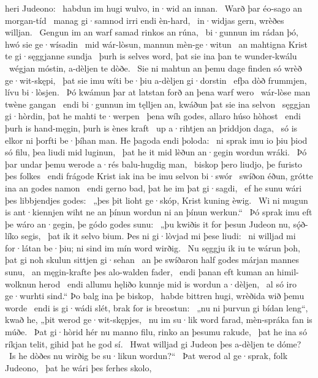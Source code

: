 heri Judeono: \hld\ habdun im hugi wulvo,
in·wid an innan. \hld\ Warð þar éo-sago
an morgan-tíd \hld\ manag gi·samnod
irri endi èn-hard, \hld\ in·widjas gern,
wrèðes willjan. \hld\ Gengun im an warf samad
rinkos an rúna, \hld\ bi·gunnun im rádan þó,
hwó sie ge·wísadin \hld\ mid wár-lòsun,
mannun mèn-ge·witun \hld\ an mahtigna Krist
te gi·sęggjanne sundja \hld\ þurh is selves word,
þat sie ina þan te wunder-kwálu \hld\ wégjan móstin,
a-dèljen te dòðe. \hld\ Sie ni mahtun an þemu dage finden
só wrèð ge·wit-skępi, \hld\ þat sie imu wíti be·þiu
a-dèljen gi·dorstin \hld\ efþa dòð frummjen,
lívu bi·lòsjen. \hld\ Þó kwámun þar at latstan forð
an þena warf wero \hld\ wár-lòse man
twène gangan \hld\ endi bi·gunnun im tęlljen an,
kwáðun þat sie ina selvon \hld\ sęggjan gi·hòrdin,
þat he mahti te·werpen \hld\ þena wíh godes,
allaro húso hòhost \hld\ endi þurh is hand-męgin,
þurh is ènes kraft \hld\ up a·rihtjen
an þriddjon daga, \hld\ só is elkor ni þorfti be·þíhan man.
He þagoda endi þoloda: \hld\ ni sprak imu io þiu þiod só filu,
þea liudi mid luginun, \hld\ þat he it mid lèðun an·gegin
wordun wráki. \hld\ Þó þar undar þemu werode a·rés
balu-hugdig man, \hld\ biskop þero liudjo,
þe furisto þes folkes \hld\ endi frágode Krist
iak ina be imu selvon bi·swór \hld\ swíðon éðun,
grótte ina an godes namon \hld\ endi gerno bad,
þat he im þat gi·sagdi, \hld\ ef he sunu wári
þes libbjendjes godes: \hld\ „þes þit lioht ge·skóp,
Krist kuning èwig. \hld\ Wi ni mugun is ant·kiennjen wiht
ne an þínun wordun ni an þínun werkun.“ \hld\ Þó sprak imu eft þe wáro an·gegin,
þe gódo godes sunu: \hld\ „þu kwiðis it for þesun Judeon nu,
sǫ́ð-líko segis, \hld\ þat ik it selvo bium.
Þes ni gi·lòvjad mi þese liudi: \hld\ ni willjad mi for·látan be·þiu;
ni sind im mín word wirðig. \hld\ Nu sęggju ik iu te wárun þoh,
þat gi noh skulun sittjen gi·sehan \hld\ an þe swíðaron half godes
márjan mannes sunu, \hld\ an męgin-krafte
þes alo-walden fader, \hld\ endi þanan eft kuman
an himil-wolknun herod \hld\ endi allumu hęliðo kunnje
mid is wordun a·dèljen, \hld\ al só iro ge·wurhti sind.“
Þo balg ina þe biskop, \hld\ habde bittren hugi,
wrèðida wið þemu worde \hld\ endi is gi·wádi slét,
brak for is breostun: \hld\ „nu ni þurvun gi bídan leng“, kwað he,
„þit werod ge·wit-skępjes, \hld\ nu im su·lik word farad,
mèn-spráka fan is múðe. \hld\ Þat gi·hòrid hér nu manno filu,
rinko an þesumu rakude, \hld\ þat he ina só ríkjan telit,
gihid þat he god sí. \hld\ Hwat willjad gi Judeon þes
a-dèljen te dóme? \hld\ Is he dòðes nu
wirðig be su·likun wordun?“ \hld\ Þat werod al ge·sprak,
folk Judeono, \hld\ þat he wári þes ferhes skolo,
